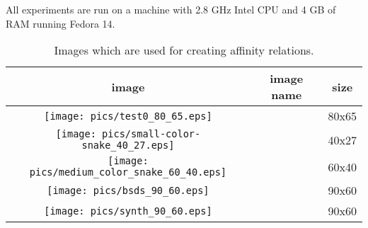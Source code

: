 \documentclass[4pt]{article}
\begin{document}
All experiments are run on a machine with 2.8 GHz Intel CPU and 4 GB of RAM running Fedora 14.

\begin{table}
\begin{center}
\begin{footnotesize}

\caption{Images which are used for creating affinity relations. }
\label{images}


\begin{tabular} {| c | c | c |}
\hline
image & image name & size  \\ \hline
\texttt{[image: pics/test0\_80\_65.eps]} &  & 80x65 \\ \hline
\texttt{[image: pics/small-color-snake\_40\_27.eps]} &  & 40x27 \\ \hline
\texttt{[image: pics/medium\_color\_snake\_60\_40.eps]} &  & 60x40 \\ \hline
\texttt{[image: pics/bsds\_90\_60.eps]} &  & 90x60 \\ \hline
\texttt{[image: pics/synth\_90\_60.eps]} &  & 90x60 \\ \hline
\end{tabular}


\end{footnotesize}
\end{center}

\end{table}
\end{document}
